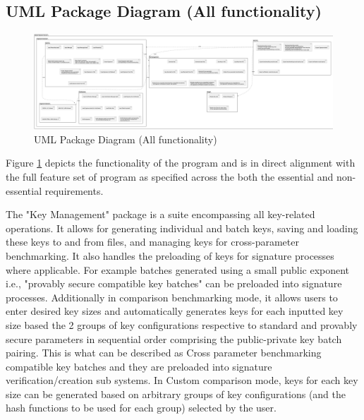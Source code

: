 \documentclass[]{final_report}
\theoremstyle{definition}
\begin{document}
\begin{landscape}
\subsection{UML Package Diagram (All functionality)}
\pagestyle{empty}

\begin{figure}[H]
    \centering
    \includegraphics[width=1.1\linewidth]{main_pictures/package.png}
    \caption{UML Package Diagram (All functionality)}
    \label{fig:pack}
\end{figure}
\end{landscape}


Figure \ref{fig:pack} depicts the functionality of the program and is in direct alignment with the full feature set of program as specified across the both the essential and non-essential requirements.

The "Key Management" package is a suite encompassing all key-related operations. It allows for generating individual and batch keys, saving and loading these keys to and from files, and managing keys for cross-parameter benchmarking. It also handles the preloading of keys for signature processes where applicable. For example batches generated using a small public exponent i.e., "provably secure compatible key batches" can be preloaded into signature processes. Additionally in comparison benchmarking mode, it allows users to enter desired key sizes and automatically generates keys for each inputted key size based the 2 groups of key configurations respective to standard and provably secure parameters in sequential order comprising the public-private key batch pairing. This is what can be described as Cross parameter benchmarking compatible key batches and they are preloaded into signature verification/creation sub systems. In Custom comparison mode, keys for each key size can be generated based on arbitrary groups of key configurations (and the hash functions to be used for each group) selected by the user.
\end{document}
